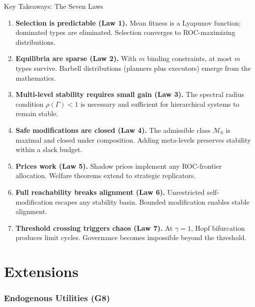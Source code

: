 \documentclass[12pt]{article}
\begin{document}
\begin{takeawaybox}{Key Takeaways: The Seven Laws}
\begin{enumerate}
    \item \textbf{Selection is predictable (Law 1).} Mean fitness is a Lyapunov function; dominated types are eliminated. Selection converges to ROC-maximizing distributions.
    
    \item \textbf{Equilibria are sparse (Law 2).} With $m$ binding constraints, at most $m$ types survive. Barbell distributions (planners plus executors) emerge from the mathematics.
    
    \item \textbf{Multi-level stability requires small gain (Law 3).} The spectral radius condition $\rho(\Gamma) < 1$ is necessary and sufficient for hierarchical systems to remain stable.
    
    \item \textbf{Safe modifications are closed (Law 4).} The admissible class $\mathcal{M}_0$ is maximal and closed under composition. Adding meta-levels preserves stability within a slack budget.
    
    \item \textbf{Prices work (Law 5).} Shadow prices implement any ROC-frontier allocation. Welfare theorems extend to strategic replicators.
    
    \item \textbf{Full reachability breaks alignment (Law 6).} Unrestricted self-modification escapes any stability basin. Bounded modification enables stable alignment.
    
    \item \textbf{Threshold crossing triggers chaos (Law 7).} At $\gamma = 1$, Hopf bifurcation produces limit cycles. Governance becomes impossible beyond the threshold.
\end{enumerate}
\end{takeawaybox}


\part{Extensions}

\section{Endogenous Utilities (G8)}
\label{sec:g8}
\end{document}
